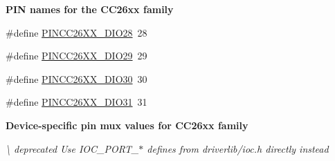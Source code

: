 \begin{Indent}{\bf P\+I\+N names for the C\+C26xx family}
\begin{DoxyCompactItemize}
\item 
\#define \hyperlink{_p_i_n_c_c26_x_x_8h_a1022f5ef1299a3d48c2816202fef95f8}{P\+I\+N\+C\+C26\+X\+X\+\_\+\+D\+I\+O28}~28
\item 
\#define \hyperlink{_p_i_n_c_c26_x_x_8h_a0aaff3357d986e4489e84a0ff3bff9dd}{P\+I\+N\+C\+C26\+X\+X\+\_\+\+D\+I\+O29}~29
\item 
\#define \hyperlink{_p_i_n_c_c26_x_x_8h_a2d36db877b96c9c26026c9c1c0514af3}{P\+I\+N\+C\+C26\+X\+X\+\_\+\+D\+I\+O30}~30
\item 
\#define \hyperlink{_p_i_n_c_c26_x_x_8h_aef532163bb931a46bcbcd00fc9ca8b18}{P\+I\+N\+C\+C26\+X\+X\+\_\+\+D\+I\+O31}~31
\end{DoxyCompactItemize}
\end{Indent}
\begin{Indent}{\bf Device-\/specific pin mux values for C\+C26xx family}\par
{\em \label{_p_i_n_c_c26_x_x_8h_PINCC26XX_MUX_VALS}%
\hypertarget{_p_i_n_c_c26_x_x_8h_PINCC26XX_MUX_VALS}{}%
 \textbackslash{} deprecated Use I\+O\+C\+\_\+\+P\+O\+R\+T\+\_\+$\ast$ defines from driverlib/ioc.\+h directly instead

}
\end{Indent}
